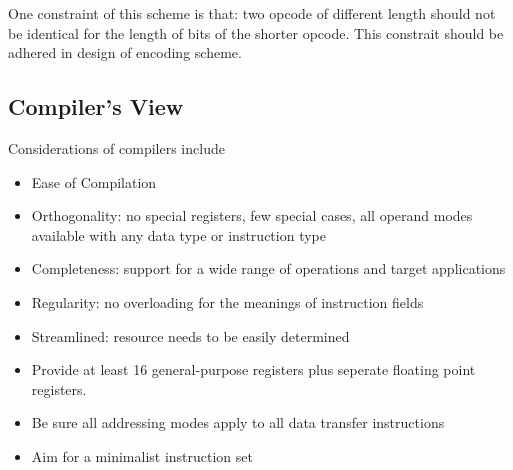 \documentclass[12pt]{article}
\theoremstyle{definition}
\begin{document}
One constraint of this scheme is that: two opcode of different length should not be identical for the length of bits of the shorter opcode. This constrait should be adhered in design of encoding scheme.
\subsection{Compiler's View}
Considerations of compilers include
\begin{itemize}
  \item Ease of Compilation
  \item Orthogonality: no special registers, few special cases, all operand modes available with any data type or instruction type
  \item Completeness: support for a wide range of operations and target applications
  \item Regularity: no overloading for the meanings of instruction fields
  \item Streamlined: resource needs to be easily determined
  \item Provide at least 16 general-purpose registers plus seperate floating point registers.
  \item Be sure all addressing modes apply to all data transfer instructions
  \item Aim for a minimalist instruction set
\end{itemize}
\clearpage
\end{document}
